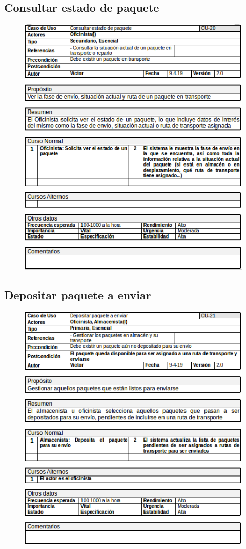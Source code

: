 \subsection{Consultar estado de paquete}
\begin{figure}[H]
	\centering
	\includegraphics[width=16cm]{20}
\end{figure}
\subsection{Depositar paquete a enviar}
\begin{figure}[H]
	\centering
	\includegraphics[width=16cm]{21}
\end{figure}
